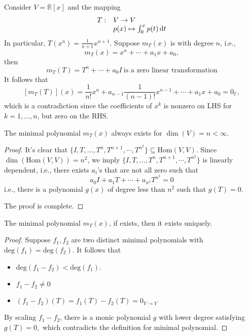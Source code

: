 \begin{example}
Consider $V=\mathbb{R}[x]$ and the mapping
\[
\begin{array}{ll}
T:&V\to V\\
&p(x)\mapsto\int_0^xp(t)\,\mathrm{d} t
\end{array}
\]
In particular, $T(x^n)=\frac{1}{n+1}x^{n+1}$.
Suppose $m_T(x)$ is with degree $n$, i.e., 
\[
m_T(x) = x^n +\cdots+a_1x+a_0,
\]
then 
\[
m_T(T)=T^n+\cdots+a_0I\ \text{is a zero linear transformation}
\]
It follows that
\[
[m_T(T)](x) = \frac{1}{n!}x^n+a_{n-1}\frac{1}{(n-1)!}x^{n-1}+\cdots+a_1x+a_0=0_{\mathbb{F}},
\]
which is a contradiction since
the coefficients of $x^k$ is nonzero on LHS for $k=1,\dots,n$, but zero on the RHS.
\end{example}

\begin{proposition}\label{pro:7:1}
The minimal polynomial $m_T(x)$ always exists for $\dim(V)=n<\infty$.
\end{proposition}
\begin{proof}
It's clear that $\{I,T,\dots,T^n,T^{n+1},\cdots,T^{n^2}\}\subseteq\text{Hom}(V,V).$
Since $\dim(\text{Hom}(V,V))=n^2$, we imply $\{I,T,\dots,T^n,T^{n+1},\cdots,T^{n^2}\}$ is linearly dependent, i.e., there exists $a_i$'s that are not all zero such that
\[
a_0I+a_1T+\cdots+a_{n^2}T^{n^2}=0
\]
i.e., there is a polynomial $g(x)$ of degree less than $n^2$ such that $g(T)=0$.

The proof is complete.
\end{proof}

\begin{proposition}\label{pro:7:2}
The minimal polynomial $m_T(x)$, if exists, then it exists uniquely.
\end{proposition}
\begin{proof}
Suppose $f_1,f_2$ are two distinct minimal polynomials with $\text{deg}(f_1)=\text{deg}(f_2)$.
It follows that
\begin{itemize}
\item
$\text{deg}(f_1-f_2)<\text{deg}(f_1)$.
\item
$f_1-f_2\ne0$
\item
$(f_1-f_2)(T) = f_1(T) - f_2(T)=0_{V\to V}$
\end{itemize}
By scaling $f_1-f_2$, there is a monic polynomial $g$ with lower degree satisfying $g(T)=0,$
which contradicts the definition for minimal polynomial.
\end{proof}

